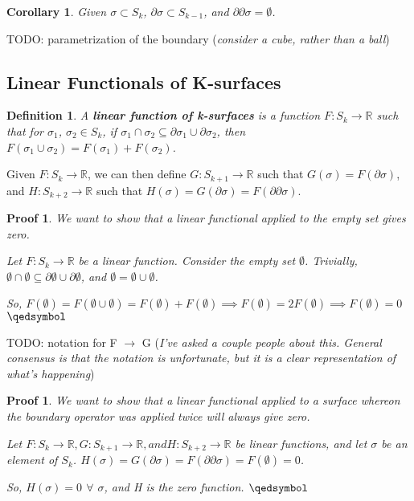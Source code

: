 \documentclass{book}
\newtheorem{defn}[equation]{Definition}
\newtheorem{coro}[equation]{Corollary}
\newtheorem{prf}[equation]{Proof}
\begin{document}
\begin{coro}
	Given $\sigma \subset S_k$, $\partial\sigma \subset S_{k-1}$, and $\partial\partial\sigma = \emptyset$. 
\end{coro}

TODO: parametrization of the boundary (\emph{consider a cube, rather than a ball})

\subsection{Linear Functionals of K-surfaces}


\begin{defn}
	A \textbf{linear function of k-surfaces} is a function $F : S_k \to \mathbb{R}$ such that for $\sigma_1$, $\sigma_2 \in S_k$, if $\sigma_1 \cap \sigma_2 \subseteq \partial\sigma_1 \cup \partial\sigma_2$, then $F(\sigma_1\cup\sigma_2) = F(\sigma_1) + F(\sigma_2)$. 
\end{defn}


Given $F : S_k \to \mathbb{R}$, we can then define $G : S_{k+1} \to \mathbb{R}$ such that $G(\sigma) = F(\partial\sigma)$, and $H : S_{k+2} \to \mathbb{R}$ such that $H(\sigma) = G(\partial\sigma) = F(\partial\partial\sigma)$. 

\begin{prf}
	We want to show that a linear functional applied to the empty set gives zero. 
	
	Let $F : S_k \to \mathbb{R}$ be a linear function. Consider the empty set $\emptyset$. 
	Trivially, $\emptyset \cap \emptyset \subseteq \partial\emptyset \cup \partial\emptyset$, and $\emptyset = \emptyset\cup\emptyset$. 
	
	So, $F(\emptyset) = F(\emptyset\cup\emptyset) = F(\emptyset) + F(\emptyset) \implies F(\emptyset) = 2F(\emptyset) \implies F(\emptyset) = 0$
	$\qedsymbol$
\end{prf}

TODO: notation for F $\to$ G (\emph{I've asked a couple people about this. General consensus is that the notation is unfortunate, but it is a clear representation of what's happening})

\begin{prf}
	We want to show that a linear functional applied to a surface whereon the boundary operator was applied twice will always give zero.
	
	Let $F : S_k \to \mathbb{R}, G : S_{k+1} \to \mathbb{R}, and H : S_{k+2} \to \mathbb{R}$ be linear functions, and let $\sigma$ be an element of $S_k$. $H(\sigma) = G(\partial\sigma) = F(\partial\partial\sigma) = F(\emptyset) = 0$. 
	
	So, $H(\sigma) = 0$ $\forall$ $\sigma$, and H is the zero function. 
	$\qedsymbol$
\end{prf}
\end{document}
